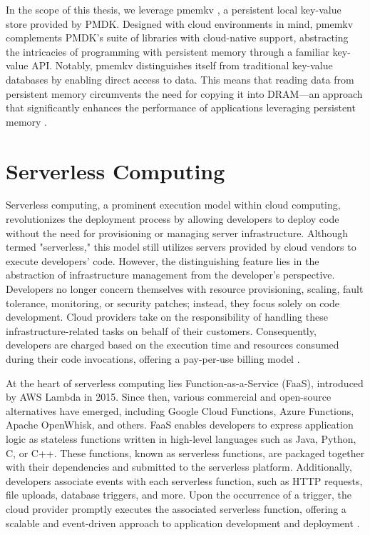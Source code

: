 In the scope of this thesis, we leverage pmemkv \cite{GitHubpm66:online}, a persistent local key-value store provided by PMDK. Designed with cloud environments in mind, pmemkv complements PMDK's suite of libraries with cloud-native support, abstracting the intricacies of programming with persistent memory through a familiar key-value API. Notably, pmemkv distinguishes itself from traditional key-value databases by enabling direct access to data. This means that reading data from persistent memory circumvents the need for copying it into DRAM—an approach that significantly enhances the performance of applications leveraging persistent memory \cite{scargall2020pmem}.

\section{Serverless Computing}
Serverless computing, a prominent execution model within cloud computing, revolutionizes the deployment process by allowing developers to deploy code without the need for provisioning or managing server infrastructure. Although termed "serverless," this model still utilizes servers provided by cloud vendors to execute developers' code. However, the distinguishing feature lies in the abstraction of infrastructure management from the developer's perspective. Developers no longer concern themselves with resource provisioning, scaling, fault tolerance, monitoring, or security patches; instead, they focus solely on code development. Cloud providers take on the responsibility of handling these infrastructure-related tasks on behalf of their customers. Consequently, developers are charged based on the execution time and resources consumed during their code invocations, offering a pay-per-use billing model \cite{jonas2019cloud,romero2021faat,klimovic2018pocket}.

At the heart of serverless computing lies Function-as-a-Service (FaaS), introduced by AWS Lambda in 2015. Since then, various commercial and open-source alternatives have emerged, including Google Cloud Functions, Azure Functions, Apache OpenWhisk, and others. FaaS enables developers to express application logic as stateless functions written in high-level languages such as Java, Python, C, or C++. These functions, known as serverless functions, are packaged together with their dependencies and submitted to the serverless platform. Additionally, developers associate events with each serverless function, such as HTTP requests, file uploads, database triggers, and more. Upon the occurrence of a trigger, the cloud provider promptly executes the associated serverless function, offering a scalable and event-driven approach to application development and deployment \cite{AWSLambd40:online,AzureFun49:online,CloudFun3:online,ApacheOp28:online}.

